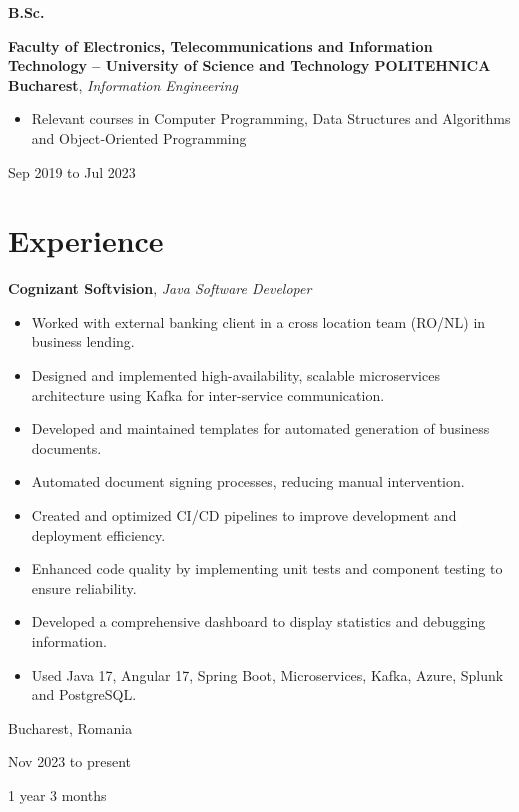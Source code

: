 \documentclass[10pt, letterpaper]{article}
\newenvironment{highlights}{
    \begin{itemize}[
        topsep=0.10 cm,
        parsep=0.10 cm,
        partopsep=0pt,
        itemsep=0pt,
        leftmargin=0.4 cm + 10pt
    ]
}{
    \end{itemize}
} %
\newenvironment{twocolentry}[2][]{
    \onecolentry
    \def\secondColumn{#2}
    \setcolumnwidth{\fill, 3.5 cm}
    \begin{paracol}{2}
}{
    \switchcolumn \raggedleft \secondColumn
    \end{paracol}
    \endonecolentry
} %
\newenvironment{threecolentry}[3][]{
    \onecolentry
    \def\thirdColumn{#3}
    \setcolumnwidth{1 cm, \fill, 3.5 cm}
    \begin{paracol}{3}
    {\raggedright #2} \switchcolumn
}{
    \switchcolumn \raggedleft \thirdColumn
    \end{paracol}
    \endonecolentry
} %
\begin{document}
        \vspace{0.2 cm}

        \begin{threecolentry}{\textbf{B.Sc.}}{
            Sep 2019 to Jul 2023
        }
            \textbf{Faculty of Electronics, Telecommunications and Information Technology – University of Science and Technology POLITEHNICA Bucharest}, \textit{Information Engineering}
            \begin{highlights}
                \item Relevant courses in Computer Programming, Data Structures and Algorithms and Object‑Oriented Programming
            \end{highlights}
        \end{threecolentry}


    
    \section{Experience}



        
        \begin{twocolentry}{
            Bucharest, Romania

        Nov 2023 to present

        1 year 3 months
        }
            \textbf{Cognizant Softvision}, \textit{Java Software Developer}
            \begin{highlights}
                \item Worked with external banking client in a cross location team (RO/NL) in business lending.
                \item Designed and implemented high-availability, scalable microservices architecture using Kafka for inter-service communication.
                \item Developed and maintained templates for automated generation of business documents.
                \item Automated document signing processes, reducing manual intervention.
                \item Created and optimized CI/CD pipelines to improve development and deployment efficiency.
                \item Enhanced code quality by implementing unit tests and component testing to ensure reliability.
                \item Developed a comprehensive dashboard to display statistics and debugging information.
                \item Used Java 17, Angular 17, Spring Boot, Microservices, Kafka, Azure, Splunk and PostgreSQL.
            \end{highlights}
        \end{twocolentry}
\end{document}
